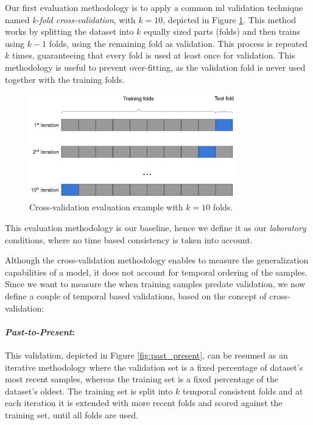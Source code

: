 Our first evaluation methodology is to apply a common \gls{ml} validation technique named \textit{k-fold cross-validation}, with $k=10$, depicted in Figure \ref{fig:xval}.
This method works by splitting the dataset into $k$ equally sized parts (folds) and then trains using $k-1$ folds, using the remaining fold as validation.
This process is repeated $k$ times, guaranteeing that every fold is used at least once for validation.
This methodology is useful to prevent over-fitting, as the validation fold is never used together with the training folds.

\begin{figure}[!htb]
	\centering
	\includegraphics[width=0.8\textwidth]{Figures/dia_xvalidation.png}
	\caption[Cross-validation evaluation example.]{Cross-validation evaluation example with $k=10$ folds.}
	\label{fig:xval}
\end{figure}

This evaluation methodology is our baseline, hence we define it as our \textit{laboratory} conditions, where no time based consistency is taken into account.

\medskip

Although the cross-validation methodology enables to measure the generalization capabilities of a model, it does not account for temporal ordering of the samples.
Since we want to measure the when training samples predate validation, we now define a couple of temporal based validations, based on the concept of cross-validation:

\paragraph{\textit{Past-to-Present}:} This validation, depicted in Figure \ref{fig:past_present}, can be resumed as an iterative methodology where the validation set is a fixed percentage of dataset's most recent samples, whereas the training set is a fixed percentage of the dataset's oldest.
The training set is split into $k$ temporal consistent folds and at each iteration it is extended with more recent folds and scored against the training set, until all folds are used.

